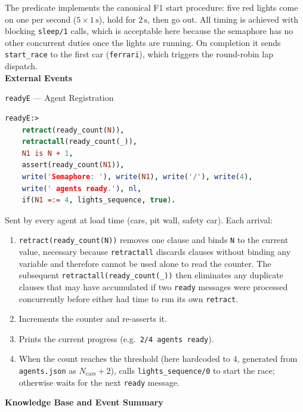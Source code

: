 The predicate implements the canonical F1 start procedure: five red lights
come on one per second ($5 \times 1\,\text{s}$), hold for
$2\,\text{s}$, then go out. All timing is achieved with blocking
\texttt{sleep/1} calls, which is acceptable here because the semaphore has
no other concurrent duties once the lights are running. On completion it
sends \texttt{start\_race} to the first car (\texttt{ferrari}), which
triggers the round-robin lap dispatch.\\

\textbf{External Events}

\begin{minipage}{\linewidth}
\texttt{readyE} --- Agent Registration

\begin{lstlisting}[language=Prolog]
readyE:>
    retract(ready_count(N)),
    retractall(ready_count(_)),
    N1 is N + 1,
    assert(ready_count(N1)),
    write('Semaphore: '), write(N1), write('/'), write(4),
    write(' agents ready.'), nl,
    if(N1 =:= 4, lights_sequence, true).
\end{lstlisting}
\end{minipage}

Sent by every agent at load time (cars, pit wall, safety car). Each arrival:
\begin{enumerate}[leftmargin=2em, itemsep=2pt]
  \item \texttt{retract(ready\_count(N))} removes one clause and binds \texttt{N}
        to the current value, necessary because \texttt{retractall} discards
        clauses without binding any variable and therefore cannot be used alone
        to read the counter. The subsequent \texttt{retractall(ready\_count(\_))}
        then eliminates any duplicate clauses that may have accumulated if two
        \texttt{ready} messages were processed concurrently before either had
        time to run its own \texttt{retract}.
  \item Increments the counter and re-asserts it.
  \item Prints the current progress (e.g.\ \texttt{2/4 agents ready}).
  \item When the count reaches the threshold (here hardcoded to 4, generated
        from \texttt{agents.json} as $N_\text{cars} + 2$), calls
        \texttt{lights\_sequence/0} to start the race; otherwise waits for
        the next \texttt{ready} message.
\end{enumerate}

\textbf{Knowledge Base and Event Summary}

